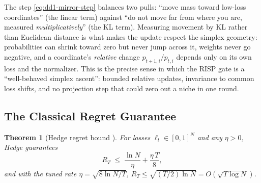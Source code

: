 \documentclass[11pt,a4paper]{article}
\theoremstyle{definition}
\theoremstyle{plain}
\newtheorem{theorem}{Theorem}[section]
\newcommand{\nm}{\textsc{RISP}}
\begin{document}
\begin{intuition}
The step \eqref{eq:dd1-mirror-step} balances two pulls: ``move mass toward
low-loss coordinates'' (the linear term) against ``do not move far from where
you are, measured \emph{multiplicatively}'' (the KL term). Measuring movement
by KL rather than Euclidean distance is what makes the update respect the
simplex geometry: probabilities can shrink toward zero but never jump across
it, weights never go negative, and a coordinate's \emph{relative} change
$p_{t+1,i}/p_{t,i}$ depends only on its own loss and the normalizer. This is
the precise sense in which the \nm{} gate is a ``well-behaved simplex
ascent'': bounded relative updates, invariance to common loss shifts, and no
projection step that could zero out a niche in one round.
\end{intuition}

\subsection{The Classical Regret Guarantee}

\begin{theorem}[Hedge regret bound \cite{freund1997decision,
cesa2006prediction}]
\label{thm:dd1-hedge-regret}
For losses $\ell_t \in [0,1]^N$ and any $\eta > 0$, Hedge guarantees
\begin{equation}
\label{eq:dd1-hedge-bound}
R_T \;\le\; \frac{\ln N}{\eta} + \frac{\eta\, T}{8},
\end{equation}
and with the tuned rate $\eta = \sqrt{8 \ln N / T}$,
$R_T \le \sqrt{(T/2) \ln N} = O(\sqrt{T \log N})$.
\end{theorem}
\end{document}
